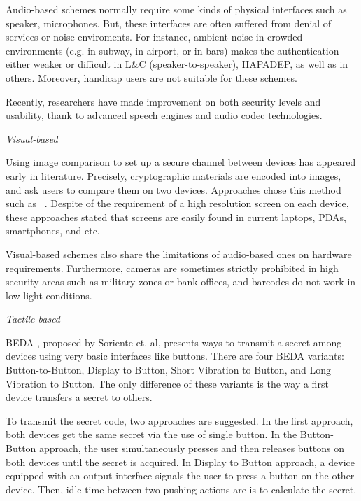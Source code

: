Audio-based schemes normally require some kinds of physical interfaces such as speaker, microphones. But, these interfaces are often suffered from denial of services or noise enviroments. For instance, ambient noise in crowded environments (e.g. in subway, in airport, or in bars) makes the authentication either weaker or difficult in L\&C (speaker-to-speaker), HAPADEP, as well as in others. Moreover, handicap users are not suitable for these schemes. 

Recently, researchers have made improvement on both security levels and usability, thank to advanced speech engines and audio codec technologies. 

\emph{Visual-based}

Using image comparison to set up a secure channel between devices has appeared early in literature. Precisely, cryptographic materials are encoded into images, and ask users to compare them on two devices. Approaches chose this method such as ~\cite{Goodrich:2009:UAS:1509221.1509226,1425062,Perrig99hashvisualization,Ellison:2003:PSG:950191.950195,1624021}. Despite of the requirement of a high resolution screen on each device, these approaches stated that screens are easily found in current laptops, PDAs, smartphones, and etc. 

Visual-based schemes also share the limitations of audio-based ones on hardware requirements. Furthermore, cameras are sometimes strictly prohibited in high security areas such as military zones or bank offices, and barcodes do not work in low light conditions. 

\emph{Tactile-based}

BEDA \cite{Soriente07beda:button-enabled}, proposed by Soriente et. al, presents ways to transmit a secret among devices using very basic interfaces like buttons. There are four BEDA variants: Button-to-Button, Display to Button, Short Vibration to Button, and Long Vibration to Button. The only difference of these variants is the way a first device transfers a secret to others. 

To transmit the secret code, two approaches are suggested. In the first approach, both devices get the same secret via the use of single button. In the Button-Button approach, the user simultaneously presses and then releases buttons on both devices until the secret is acquired. In Display to Button approach, a device equipped with an output interface signals the user to press a button on the other device. Then, idle time between two pushing actions are is to calculate the secret. 

